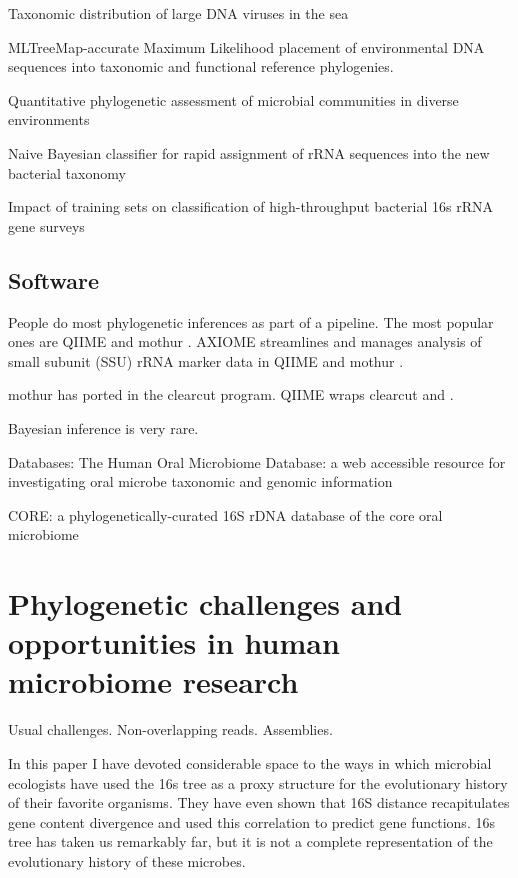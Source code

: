 \documentclass{amsart}
\begin{document}
\citep{monierEaLargeViruses08}
{Taxonomic distribution of large DNA viruses in the sea}

\citep{stark2010mltreemap}
{{MLTreeMap}-accurate Maximum Likelihood placement of environmental DNA sequences into taxonomic and functional reference phylogenies.}

\citep{vonMeringEaQuantitative08}
{Quantitative phylogenetic assessment of microbial communities in diverse environments}


\citep{huson2007megan}

\citep{wang2007naive}
{Naive Bayesian classifier for rapid assignment of rRNA sequences into the new bacterial taxonomy}

\citep{werner2011impact}
Impact of training sets on classification of high-throughput bacterial 16s rRNA gene surveys



\subsection{Software}

People do most phylogenetic inferences as part of a pipeline.
The most popular ones are QIIME \citep{caporaso2010qiime} and mothur \citep{schloss2009introducing}.
AXIOME streamlines and manages analysis of small subunit (SSU) rRNA marker data in QIIME and mothur \citep{lynch2013axiome}.

mothur has ported in the clearcut \citep{evans2006relaxed,sheneman2006clearcut} program.
QIIME wraps clearcut and \citep{price2010fasttree}.

Bayesian inference is very rare.

Databases:
\citep{chen2010human}
The Human Oral Microbiome Database: a web accessible resource for investigating oral microbe taxonomic and genomic information

\citep{griffen2011core}
CORE: a phylogenetically-curated 16S rDNA database of the core oral microbiome

\citep{srinivasan2012bacterial}


\section{Phylogenetic challenges and opportunities in human microbiome research}

Usual challenges.
Non-overlapping reads.
Assemblies.

In this paper I have devoted considerable space to the ways in which microbial ecologists have used the 16s tree as a proxy structure for the evolutionary history of their favorite organisms.
They have even shown that 16S distance recapitulates gene content divergence and used this correlation to predict gene functions.
16s tree has taken us remarkably far, but it is not a complete representation of the evolutionary history of these microbes.
\end{document}
